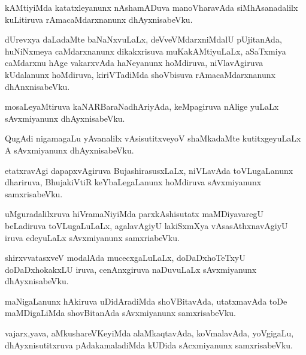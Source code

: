 \documentclass{article}
\begin{document}
\begin{mn}%
kAMtiyiMda katatxleyanunx nAshamADuva manoVharavAda siMhAsanadalilx kuLitiruva 
rAmacaMdarxnanunx dhAyxnisabeVku.
\end{mn}

\begin{mn}%
dUrevxya daLadaMte baNaNxvuLaLx, deVveVMdarxniMdalU pUjitanAda, huNiNxmeya caMdarxnanunx 
dikakxrisuva muKakAMtiyuLaLx, aSaTxmiya caMdarxnu hAge vakarxvAda haNeyanunx hoMdiruva, 
niVlavAgiruva kUdalanunx hoMdiruva, kiriVTadiMda shoVbisuva rAmacaMdarxnanunx dhAnxnisabeVku.
\end{mn}

\begin{mn}%
mosaLeyaMtiruva kaNARBaraNadhAriyAda, keMpagiruva nAlige yuLaLx sAvxmiyanunx dhAyxnisabeVku.
\end{mn}

\begin{mn}%
QugAdi nigamagaLu yAvanalilx vAsisutitxveyoV shaMkadaMte kutitxgeyuLaLx A sAvxmiyanunx 
dhAyxnisabeVku.
\end{mn}

\begin{mn}%
etatxravAgi dapapxvAgiruva BujashirasusxLaLx, niVLavAda toVLugaLanunx dhariruva, BhujakiVtiR
keYbaLegaLanunx hoMdiruva sAvxmiyanunx samxrisabeVku.
\end{mn}

\begin{mn}%
uMguradalilxruva hiVramaNiyiMda parxkAshisutatx maMDiyavaregU beLadiruva toVLugaLuLaLx, 
agalavAgiyU lakiSxmXya vAsasAthxnavAgiyU iruva edeyuLaLx sAvxmiyanunx samxriabeVku.
\end{mn}

\begin{mn}%
shirxvvatasxveV modalAda mucecxgaLuLaLx, doDaDxhoTeTxyU doDaDxhokakxLU iruva, cenAnxgiruva 
naDuvuLaLx sAvxmiyanunx dhAyxnisabeVku.
\end{mn}

\begin{mn}%
maNigaLanunx hAkiruva uDidAradiMda shoVBitavAda, utatxmavAda toDe maMDigaLiMda shovBitanAda 
sAvxmiyanunx samxrisabeVku.
\end{mn}

\begin{mn}%
vajarx,yava, aMkushareVKeyiMda alaMkaqtavAda, koVmalavAda, yoVgigaLu, dhAyxnisutitxruva 
pAdakamaladiMda kUDida sAcxmiyanunx samxrisabeVku.
\end{mn}
\end{document}
